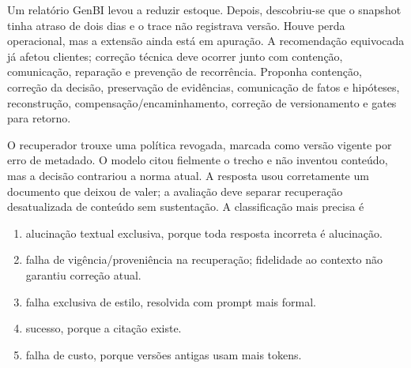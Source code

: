 \TextoBase
Um relatório GenBI levou a reduzir estoque. Depois, descobriu-se que o snapshot tinha atraso de dois dias e o trace não registrava versão. Houve perda operacional, mas a extensão ainda está em apuração.
A recomendação equivocada já afetou clientes; correção técnica deve ocorrer junto com contenção, comunicação, reparação e prevenção de recorrência.
\FonteDidatica
\Comando Proponha contenção, correção da decisão, preservação de evidências, comunicação de fatos e hipóteses, reconstrução, compensação/encaminhamento, correção de versionamento e gates para retorno.

\TextoBase
O recuperador trouxe uma política revogada, marcada como versão vigente por erro de metadado. O modelo citou fielmente o trecho e não inventou conteúdo, mas a decisão contrariou a norma atual.
A resposta usou corretamente um documento que deixou de valer; a avaliação deve separar recuperação desatualizada de conteúdo sem sustentação.
\FonteDidatica
\Comando A classificação mais precisa é
\begin{enumerate}[label=\Alph*)]
\item alucinação textual exclusiva, porque toda resposta incorreta é alucinação.
\item falha de vigência/proveniência na recuperação; fidelidade ao contexto não garantiu correção atual.
\item falha exclusiva de estilo, resolvida com prompt mais formal.
\item sucesso, porque a citação existe.
\item falha de custo, porque versões antigas usam mais tokens.
\end{enumerate}
